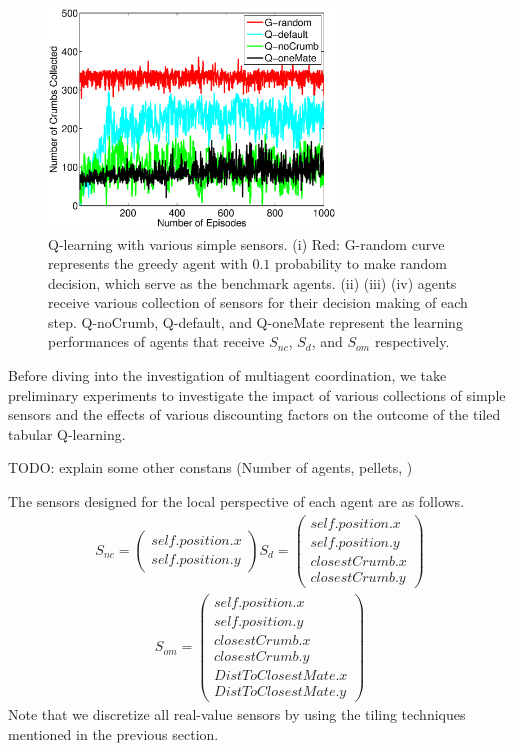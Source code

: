 \documentclass[conference]{IEEEtran}
\begin{document}
\begin{figure}[!t]
\centering
\includegraphics[width=3.0in]{./figures/RL/init_setup1.eps}
\caption{Q-learning with various simple sensors. (i) Red: G-random curve
    represents the greedy agent with $0.1$ probability to make random
    decision, which serve as the benchmark agents. 
    (ii) (iii) (iv) agents receive various collection of sensors for their
    decision making of each step. Q-noCrumb, Q-default, and Q-oneMate
    represent the learning performances of agents that receive $S_{nc}$,
    $S_{d}$, and $S_{om}$ respectively.
} 
\label{fig:RL_init}
\end{figure}

Before diving into the investigation of multiagent coordination, we take 
preliminary experiments to investigate the impact of various collections of
simple sensors and the effects of various discounting factors on the outcome
of the tiled tabular Q-learning.

TODO: explain some other constans (Number of agents, pellets, )


The sensors designed for the local perspective of each agent are as follows. 
\begin{align}
    S_{nc} = \left( \begin{array}{c}
      self.position.x \\
      self.position.y 
  \end{array} \right)
    S_{d} = \left( \begin{array}{c}
      self.position.x \\
      self.position.y \\
      closestCrumb.x \\
      closestCrumb.y 
  \end{array} \right)
    \nonumber
\end{align}
\begin{align}
        S_{om} = \left( \begin{array}{c}
      self.position.x \\
      self.position.y \\
      closestCrumb.x \\
      closestCrumb.y  \\
      DistToClosestMate.x \\
      DistToClosestMate.y 
  \end{array} \right)
        \nonumber
\end{align}
Note that we discretize all real-value sensors by using the tiling
techniques mentioned in the previous section. 
\end{document}
